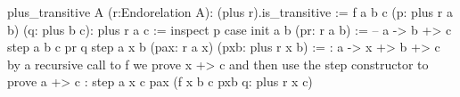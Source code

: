\begin{alba}
  plus_transitive A (r:Endorelation A): (plus r).is_transitive :=
    f a b c (p: plus r a b) (q: plus b c): plus r a c :=
      inspect
        p
      case
        init a b (pr: r a b) :=
            -- a -> b +> c
          step a b c pr q
        step a x b (pax: r a x) (pxb: plus r x b) :=
            {: a -> x +> b +> c
               by a recursive call to f we prove x +> c
               and then use the step constructor to prove a +> c :}
          step a x c pax (f x b c pxb q: plus r x c)
\end{alba}



